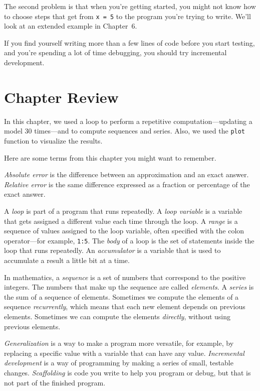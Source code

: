The second problem is that when you're getting started, you might not know how to
choose steps that get from \lstinline{x = 5} to the program you're trying
to write.  We'll look at an extended example in Chapter~6.

If you find yourself writing more than a few lines of code before
you start testing, and you're spending a lot of time debugging,
you should try incremental development.




\section{Chapter Review}

In this chapter, we used a loop to perform a repetitive computation---updating a model 30 times---and to compute sequences and series.  Also,  we used the \lstinline{plot} function to visualize the results.

Here are some terms from this chapter you might want to remember.

\emph{Absolute error} is the difference between an approximation and
an exact answer. \emph{Relative error} is the same difference expressed as a fraction or percentage of the exact answer.

A \emph{loop} is part of a program that runs repeatedly.
A \emph{loop variable} is a variable that gets assigned a different value each time through the loop.
A \emph{range} is a sequence of values assigned to the loop variable, often
specified with the colon operator---for example, \lstinline{1:5}.
The \emph{body} of a loop is the set of statements inside the loop that runs repeatedly.
An \emph{accumulator} is a variable that is used to accumulate a result a little bit at a time.

In mathematics, a \emph{sequence} is a set of numbers that correspond
to the positive integers.
The numbers that make up the sequence are called \mbox{\emph{elements}}.
A \emph{series} is the sum of a sequence of elements.
Sometimes we compute the elements of a sequence \emph{recurrently}, which means that each new element depends on previous elements.  Sometimes we can compute the elements \emph{directly}, without using previous elements.

\emph{Generalization} is a way to make a program more versatile, for example, by replacing a specific value with a variable that can have any value.
\emph{Incremental development} is a way of programming by making a series of small, testable changes.
\emph{Scaffolding} is code you write to help you program or debug, but
that is not part of the finished program.

